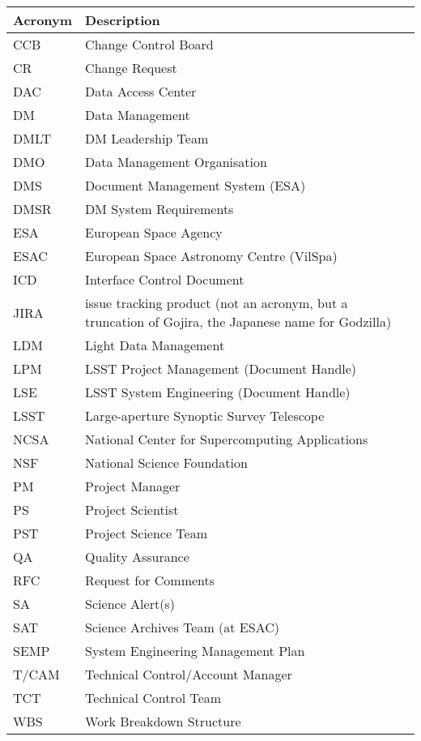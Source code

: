 \addtocounter{table}{-1}
\begin{longtable}{|l|p{}|}\hline 
\textbf{Acronym} & \textbf{Description}  \\\hline
CCB&Change Control Board \\\hline
CR&Change Request \\\hline
DAC&Data Access Center \\\hline
DM&Data Management \\\hline
DMLT&DM Leadership Team \\\hline
DMO&Data Management Organisation \\\hline
DMS&Document Management System (ESA) \\\hline
DMSR&DM System Requirements \\\hline
ESA&European Space Agency \\\hline
ESAC&European Space Astronomy Centre (VilSpa) \\\hline
ICD&Interface Control Document \\\hline
JIRA&issue tracking product (not an acronym, but a truncation of Gojira, the Japanese name for Godzilla) \\\hline
LDM&Light Data Management \\\hline
LPM&LSST Project Management (Document Handle) \\\hline
LSE&LSST System Engineering (Document Handle) \\\hline
LSST&Large-aperture Synoptic Survey Telescope \\\hline
NCSA&National Center for Supercomputing Applications \\\hline
NSF&National Science Foundation \\\hline
PM&Project Manager \\\hline
PS&Project Scientist \\\hline
PST&Project Science Team \\\hline
QA&Quality Assurance \\\hline
RFC&Request for Comments \\\hline
SA&Science Alert(s) \\\hline
SAT&Science Archives Team (at ESAC) \\\hline
SEMP&System Engineering Management Plan \\\hline
T/CAM&Technical Control/Account Manager \\\hline
TCT&Technical Control Team \\\hline
WBS&Work Breakdown Structure \\\hline
\end{longtable}
